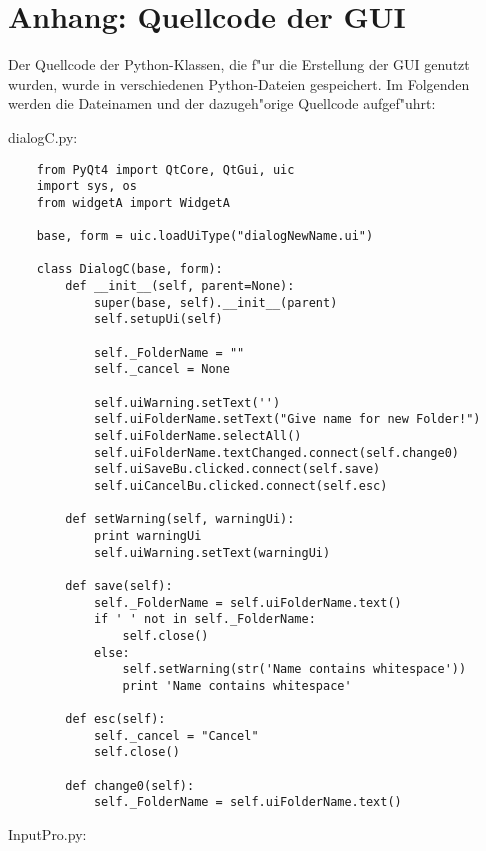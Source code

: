 \chapter{Anhang: Quellcode der GUI}

Der Quellcode der Python-Klassen, die f"ur die Erstellung der GUI genutzt wurden, wurde in verschiedenen 
Python-Dateien gespeichert. Im Folgenden werden die Dateinamen und der dazugeh"orige Quellcode aufgef"uhrt:

\vspace{5mm}

dialogC.py:
\begin{verbatim}
    from PyQt4 import QtCore, QtGui, uic
    import sys, os
    from widgetA import WidgetA
    
    base, form = uic.loadUiType("dialogNewName.ui")
    
    class DialogC(base, form):
        def __init__(self, parent=None):
            super(base, self).__init__(parent)
            self.setupUi(self)
    
            self._FolderName = ""
            self._cancel = None
    
            self.uiWarning.setText('')
            self.uiFolderName.setText("Give name for new Folder!")
            self.uiFolderName.selectAll()
            self.uiFolderName.textChanged.connect(self.change0)
            self.uiSaveBu.clicked.connect(self.save)
            self.uiCancelBu.clicked.connect(self.esc)
        
        def setWarning(self, warningUi):
            print warningUi
            self.uiWarning.setText(warningUi)
    
        def save(self):
            self._FolderName = self.uiFolderName.text()
            if ' ' not in self._FolderName:
                self.close()
            else:
                self.setWarning(str('Name contains whitespace'))
                print 'Name contains whitespace'
    
        def esc(self):
            self._cancel = "Cancel"
            self.close()
    
        def change0(self):
            self._FolderName = self.uiFolderName.text()
\end{verbatim}

InputPro.py:

